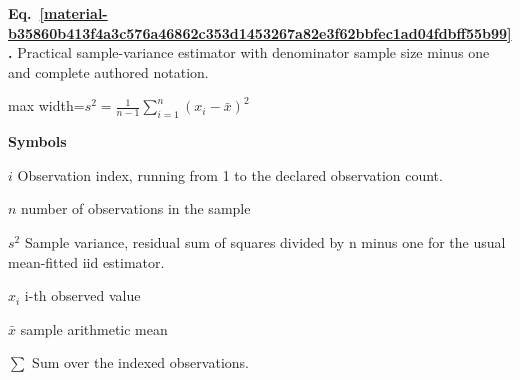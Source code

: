 \documentclass[11pt,a4paper]{article}
\begin{document}
\par\medskip
\noindent\begin{minipage}{\linewidth}
\label{material-b35860b413f4a3c576a46862c353d1453267a82e3f62bbfec1ad04fdbff55b99}
\noindent\textbf{Eq.~\ref*{material-b35860b413f4a3c576a46862c353d1453267a82e3f62bbfec1ad04fdbff55b99}.} Practical sample-variance estimator with denominator sample size minus one and complete authored notation.\par\nopagebreak
\begin{center}\begin{adjustbox}{max width=\linewidth}$\displaystyle s^2=\frac1{n-1}\sum_{i=1}^n(x_i-\bar x)^2$\end{adjustbox}\end{center}

\par\noindent\textbf{Symbols}

\par\noindent\textbf{\(i\)} Observation index, running from 1 to the declared observation count.

\par\noindent\textbf{\(n\)} number of observations in the sample

\par\noindent\textbf{\(s^2\)} Sample variance, residual sum of squares divided by n minus one for the usual mean-fitted iid estimator.

\par\noindent\textbf{\(x_i\)} i-th observed value

\par\noindent\textbf{\(\bar{x}\)} sample arithmetic mean

\par\noindent\textbf{\(\sum\)} Sum over the indexed observations.

\end{minipage}\par
\medskip
\end{document}
